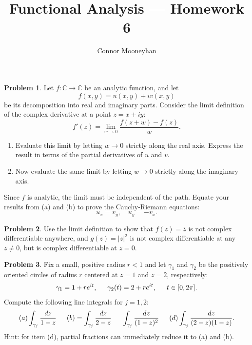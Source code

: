\documentclass[12pt]{article}
\title{Functional Analysis --- Homework 6}
\author{Connor Mooneyhan}
\date{}
\theoremstyle{definition}
\newtheorem{ex}{Problem}
\begin{document}
\maketitle

\begin{ex}
	Let $f : \mathbb{C} \to \mathbb{C}$ be an analytic function, and let \begin{equation*}
		f(x, y) = u(x,y) + iv(x,y)
	\end{equation*}
	be its decomposition into real and imaginary parts.
	Consider the limit definition of the complex derivative at a point $z = x + iy$: \begin{equation*}
		f'(z) = \lim_{w\to 0} \frac{f(z+w) - f(z)}{w}.
	\end{equation*}
	\begin{enumerate}[label=(\alph*)]
		\item Evaluate this limit by letting $w \to 0$ strictly along the real axis.
		      Express the result in terms of the partial derivatives of $u$ and $v$.
		\item Now evaluate the same limit by letting $w \to 0$ strictly along the imaginary axis.
	\end{enumerate}
	Since $f$ is analytic, the limit must be independent of the path.
	Equate your results from (a) and (b) to prove the Cauchy-Riemann equations: \begin{equation*}
		u_x = v_y, \hspace{1em} u_y = -v_x.
	\end{equation*}
\end{ex}

\begin{ex}
  Use the limit definition to show that $f(z) = \overline{z}$ is not complex differentiable anywhere, and $g(z) = |z|^2$ is not complex differentiable at any $z \neq 0$, but is complex differentiable at $z = 0$.
\end{ex}

\begin{ex}
  Fix a small, positive radius $r < 1$ and let $\gamma_1$ and $\gamma_2$ be the positively oriented circles of radius $r$ centered at $z = 1$ and $z = 2$, respectively: \begin{equation*}
    \gamma_1 = 1 + re^{it}, \hspace{1.5em} \gamma_2(t) = 2+re^{it},\hspace{1.5em} t \in [0, 2\pi].
  \end{equation*}
  Compute the following line integrals for $j = 1,2$: \begin{equation*}
    (a) \int_{\gamma_j} \frac{dz}{1-z} \hspace{1.5em} (b) = \int_{\gamma_j}\frac{dz}{2-z} \hspace{1.5em} \int_{\gamma_j} \frac{dz}{(1-z)^2} \hspace{1.5em} (d) \int_{\gamma_j} \frac{dz}{(2-z)(1-z)}.
  \end{equation*}
  Hint: for item (d), partial fractions can immediately reduce it to (a) and (b).
\end{ex}
\end{document}

